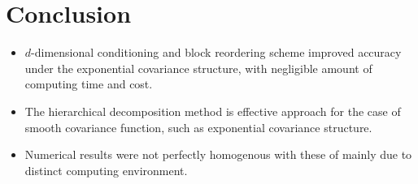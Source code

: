 \section{Conclusion}

\begin{frame}{\secname}

    \begin{itemize}
        \item $d$-dimensional conditioning and block reordering scheme improved accuracy under the exponential covariance structure, with negligible amount of computing time and cost.
        \item The hierarchical decomposition method is effective approach for the case of smooth covariance function, such as exponential covariance structure.
        \item Numerical results were not perfectly homogenous with these of \citet{cao2019hierarchical} mainly due to distinct computing environment.
    \end{itemize}
    
\end{frame}
